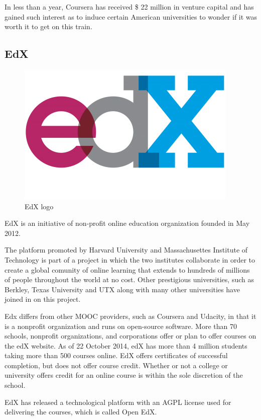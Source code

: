 In less than a year, Coursera has received \$ 22 million in venture capital and has gained such interest as to induce certain American universities to wonder if it was worth it to get on this train.

\subsection{EdX}
\label{subsec:EdX}
\begin{figure}[htb] %
 \centering
 \includegraphics[width=0.5\linewidth]{images/chapter1/edx_logo.png}\hfill
 \caption[EdX logo]{EdX logo}
 \label{fig:fourV}
\end{figure}

EdX is an initiative of non-profit online education organization founded in May 2012.


The platform promoted by Harvard University and Massachusettes Institute of Technology is part of a project in which the two institutes collaborate in order to create a global comunity of online learning that extends to hundreds of millions of people throughout the world at no cost. Other prestigious universities, such as Berkley, Texas University and UTX along with many other universities have joined in on this project.

Edx differs from other MOOC providers, such as Coursera and Udacity, in that it is a nonprofit organization and runs on open-source software.\cite{mooc_edx}
More than 70 schools, nonprofit organizations, and corporations offer or plan to offer courses on the edX website.
As of 22 October 2014, edX has more than 4 million students taking more than 500 courses online.\cite{mooc_edx}
EdX offers certificates of successful completion, but does not offer course credit. Whether or not a college or university offers credit for an online course is within the sole discretion of the school.\cite{mooc_edx}

EdX has released a technological platform with an AGPL license used for delivering the courses, which is called Open EdX.

